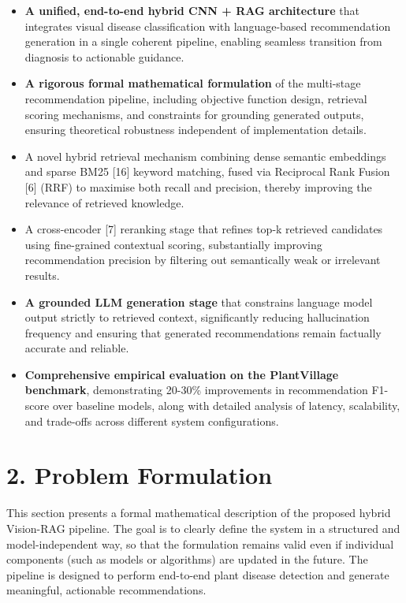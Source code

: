 \begin{itemize}
\item
  \textbf{A unified, end-to-end hybrid CNN + RAG architecture} that
  integrates visual disease classification with language-based
  recommendation generation in a single coherent pipeline, enabling
  seamless transition from diagnosis to actionable guidance.
\item
  \textbf{A rigorous formal mathematical formulation} of the multi-stage
  recommendation pipeline, including objective function design,
  retrieval scoring mechanisms, and constraints for grounding generated
  outputs, ensuring theoretical robustness independent of implementation
  details.
\item
  A novel hybrid retrieval mechanism combining dense semantic embeddings
  and sparse BM25 {[}16{]} keyword matching, fused via Reciprocal Rank
  Fusion {[}6{]} (RRF) to maximise both recall and precision, thereby
  improving the relevance of retrieved knowledge.
\item
  A cross-encoder {[}7{]} reranking stage that refines top-k retrieved
  candidates using fine-grained contextual scoring, substantially
  improving recommendation precision by filtering out semantically weak
  or irrelevant results.
\item
  \textbf{A grounded LLM generation stage} that constrains language
  model output strictly to retrieved context, significantly reducing
  hallucination frequency and ensuring that generated recommendations
  remain factually accurate and reliable.
\item
  \textbf{Comprehensive empirical evaluation on the PlantVillage
  benchmark}, demonstrating 20-30\% improvements in recommendation
  F1-score over baseline models, along with detailed analysis of
  latency, scalability, and trade-offs across different system
  configurations.
\end{itemize}

\section*{2. Problem Formulation}\label{problem-formulation}

This section presents a formal mathematical description of the proposed
hybrid Vision-RAG pipeline. The goal is to clearly define the system in
a structured and model-independent way, so that the formulation remains
valid even if individual components (such as models or algorithms) are
updated in the future. The pipeline is designed to perform end-to-end
plant disease detection and generate meaningful, actionable
recommendations.

